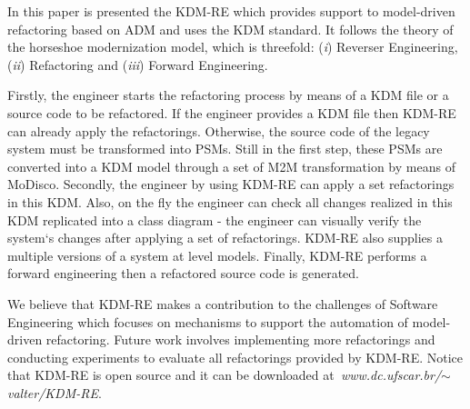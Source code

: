 In this paper is presented the KDM-RE which provides support to model-driven refactoring based on ADM and uses the KDM standard. It follows the theory of the horseshoe modernization model, which is threefold: (\textit{i}) Reverser Engineering, (\textit{ii}) Refactoring and  (\textit{iii}) Forward Engineering. 

Firstly, the engineer starts the refactoring process by means of a KDM file or a source code to be refactored. If the engineer provides a KDM file then KDM-RE can already apply the refactorings. Otherwise, the source code of the legacy system must be transformed into PSMs. Still in the first step, these PSMs are converted into a KDM model through a set of M2M transformation by means of MoDisco. Secondly, the engineer by using KDM-RE can apply a set refactorings in this KDM. Also, on the fly the engineer can check all changes realized in this KDM replicated into a class diagram - the engineer can visually verify the system`s changes after applying a set of refactorings. KDM-RE also supplies a multiple versions of a system at level models. Finally, KDM-RE performs a forward engineering then a refactored source code is generated.

We believe that KDM-RE makes a contribution to the challenges of Software Engineering which focuses on mechanisms to support the automation of model-driven refactoring. Future work involves implementing more refactorings and conducting experiments to evaluate all refactorings provided by KDM-RE. Notice that KDM-RE is open source and it can be downloaded at\textit{~www.dc.ufscar.br/$\sim$valter/KDM-RE}.
